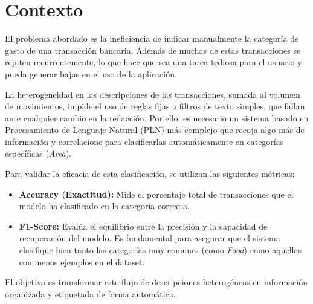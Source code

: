 \section{Contexto}
\label{sec:contexto}

El problema abordado es la ineficiencia de indicar manualmente la categoría de gasto de una transacción bancaria. Además de muchas de estas transacciones se repiten recurrentemente, lo que hace que sea una tarea tediosa para el usuario y pueda generar bajas en el uso de la aplicación. 

La heterogeneidad en las descripciones de las transacciones, sumada al volumen de movimientos, impide el uso de reglas fijas o filtros de texto simples, que fallan ante cualquier cambio en la redacción. Por ello, es necesario un sistema basado en Procesamiento de Lenguaje Natural (PLN) más complejo que recoja algo más de información y correlacione para clasificarlas automáticamente en categorías específicas (\textit{Area}). 

Para validar la eficacia de esta clasificación, se utilizan las siguientes métricas:

\begin{itemize}
    \item \textbf{Accuracy (Exactitud):} Mide el porcentaje total de transacciones que el modelo ha clasificado en la categoría correcta.
    \item \textbf{F1-Score:} Evalúa el equilibrio entre la precisión y la capacidad de recuperación del modelo. Es fundamental para asegurar que el sistema clasifique bien tanto las categorías muy comunes (como \textit{Food}) como aquellas con menos ejemplos en el dataset.
\end{itemize}

El objetivo es transformar este flujo de descripciones heterogéneas en información organizada y etiquetada de forma automática.